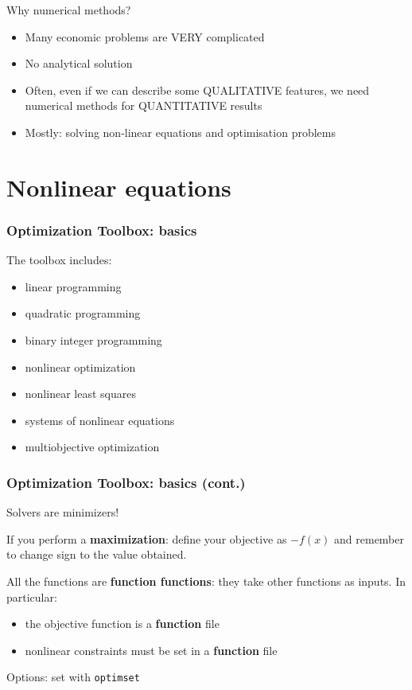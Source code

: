 \documentclass[show notes]{beamer}%
\begin{document}
\begin{frame}[fragile]{Why numerical methods?}
\begin{itemize}[<+->]
\item Many economic problems are VERY complicated
\item No analytical solution
\item Often, even if we can describe some QUALITATIVE features, we need numerical methods for QUANTITATIVE results
\item Mostly: solving non-linear equations and optimisation problems
\end{itemize}
\end{frame}

\section{Nonlinear equations}


\begin{frame}[fragile]
\frametitle{Optimization Toolbox: basics}
The toolbox includes:
\begin{itemize}[<+->]
\item linear programming
\item quadratic programming
\item binary integer programming
\item nonlinear optimization
\item nonlinear least squares
\item systems of nonlinear equations
\item multiobjective optimization
\end{itemize}

\end{frame}


\begin{frame}[fragile]
\frametitle{Optimization Toolbox: basics (cont.)}
Solvers are minimizers!\pause

If you perform a \textbf{maximization}: define your objective as $-f(x)$ and remember to change sign to the value obtained.\pause

All the functions are \textbf{function functions}: they take other functions as inputs. In particular:
\begin{itemize}
\item the objective function is a \textbf{function} file
\item nonlinear constraints must be set in a \textbf{function} file
\end{itemize}\pause

Options: set with \texttt{optimset}

\end{frame}
\end{document}

